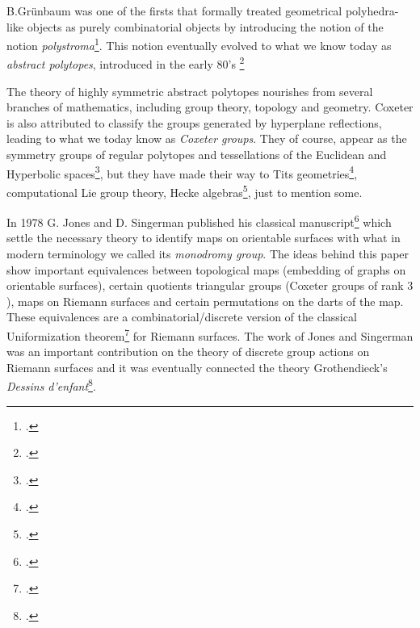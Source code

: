  B.Grünbaum was one of the firsts that formally treated geometrical polyhedra-like objects as purely combinatorial objects by introducing the notion of the notion \emph{polystroma}\footcite{Gruenbaum_1978_RegularityGraphsComplexes}.
This notion eventually evolved to what we know today as \emph{abstract polytopes}, introduced in the early 80's
\footcite{Schulte_1980_RegulareInzidenzkomplexe_PhDThesis}%

The theory of highly symmetric abstract polytopes nourishes from several branches of mathematics, including group theory, topology and geometry.
Coxeter is also attributed to classify the groups generated by hyperplane reflections, leading to what we today know as \emph{Coxeter groups}.
They of course, appear as the symmetry groups of regular polytopes and tessellations of the Euclidean and Hyperbolic spaces\footcite{Humphreys_1990_ReflectionGroupsCoxeter}, but they have made their way to Tits geometries\footcite{Tits_1974_BuildingsSphericalType}, computational Lie group theory, Hecke algebras\footcite{Cohen_1991_CoxeterGroupsThree}, just to mention some.

In 1978 G. Jones and D. Singerman published his classical manuscript\footcite{JonesSingerman_1978_TheoryMapsOrientable} which settle the necessary theory to identify maps on orientable surfaces with what in modern terminology we called its \emph{monodromy group}.
The ideas behind this paper show important equivalences between topological maps (embedding of graphs on orientable surfaces), certain quotients triangular groups (Coxeter groups of rank $3$), maps on Riemann surfaces and certain permutations on the darts of the map.
These equivalences are a combinatorial/discrete version of the classical Uniformization theorem\footcite{Abikoff_1981_UniformizationTheorem} for Riemann surfaces.
The work of Jones and Singerman was an important contribution on the theory of discrete group actions on Riemann surfaces and it was eventually connected the theory Grothendieck's \emph{Dessins d'enfant}\footcite{JonesWolfart_2016_DessinsDenfantsRiemann}.

